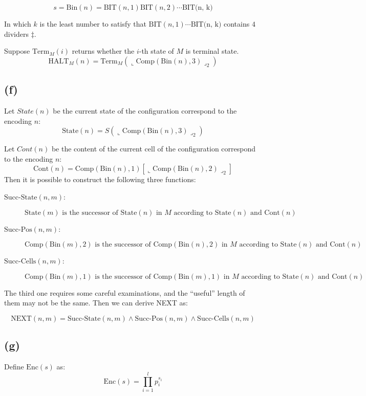 \documentclass[paper=a4, fontsize=11pt]{scrartcl} %
\numberwithin{equation}{section} %
\numberwithin{figure}{section} %
\numberwithin{table}{section} %
\begin{document}
$$s = \textrm{Bin}(n) = \textrm{BIT}(n, 1) \textrm{BIT}(n, 2) \cdots \textrm{BIT(n, k)}$$

In which $k$ is the least number to satisfy that $\textrm{BIT}(n,1)\cdots \textrm{BIT(n, k)}$ contains $4$ dividers $\ddag$.

Suppose $\textrm{Term}_M(i)$ returns whether the $i$-th state of $M$ is terminal state.
$$\textrm{HALT}_M(n) = \textrm{Term}_M\left(\llcorner \textrm{Comp}(\textrm{Bin}(n),3) \lrcorner_2\right) $$

\subsection*{(f)}
Let $State(n)$ be the current state of the configuration correspond to the encoding $n$:
$$\textrm{State}(n) = S\left(\llcorner \textrm{Comp}(\textrm{Bin}(n), 3) \lrcorner_2 \right) $$

Let $Cont(n)$ be the content of the current cell of the configuration correspond to the encoding $n$:
$$\textrm{Cont}(n) = \textrm{Comp}(\textrm{Bin}(n), 1)\left[\llcorner \textrm{Comp}(\textrm{Bin}(n), 2) \lrcorner_2\right] $$
Then it is possible to construct the following three functions:

\begin{description}
	\item[$\textrm{Succ-State}(n, m)$:]
$$\textrm{State}(m) \textrm{ is the successor of State}(n)\textrm{ in } M \textrm{ according to State}(n) \textrm{ and Cont}(n) $$
	\item[$\textrm{Succ-Pos}(n, m)$:]
$$\textrm{Comp}(\textrm{Bin}(m), 2) \textrm{ is the successor of }\textrm{Comp}(\textrm{Bin}(n), 2)\textrm{ in } M \textrm{ according to State}(n) \textrm{ and Cont}(n) $$
	\item[$\textrm{Succ-Cells}(n, m)$:]
$$\textrm{Comp}(\textrm{Bin}(m), 1) \textrm{ is the successor of }\textrm{Comp}(\textrm{Bin}(m), 1)\textrm{ in } M \textrm{ according to State}(n) \textrm{ and Cont}(n) $$
\end{description}

The third one requires some careful examinations, and the ``useful'' length of them may not be the same. Then we can derive \textrm{NEXT} as:

$$\textrm{NEXT}(n, m) = \textrm{Succ-State}(n, m) \wedge \textrm{Succ-Pos}(n, m) \wedge \textrm{Succ-Cells}(n, m)$$

\subsection*{(g)}
Define $\textrm{Enc}(s)$ as:
$$\textrm{Enc}(s) = \prod_{i=1}^{l}p_i^{s_i} $$
\end{document}
